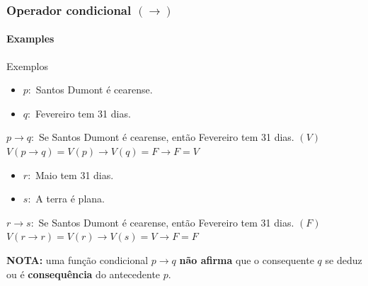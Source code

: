 \documentclass[10pt, headsepline, captions=tableabove, xcolor=table]{beamer}
\begin{document}
\begin{frame}[t]
    \frametitle{Operador condicional $(\rightarrow)$ }
    \framesubtitle{Examples}
    \small
    \begin{exampleblock}{Exemplos}
        \begin{itemize}
            \item[] $p:$ Santos Dumont é cearense.
            \item[] $q:$ Fevereiro tem 31 dias.
        \end{itemize}
        $p \rightarrow q:$ Se Santos Dumont é cearense, então Fevereiro tem 31 dias. $(V)$ \\[2pt]
        $V(p \rightarrow q) = V(p) \rightarrow V(q) = F \rightarrow F = V$
    \end{exampleblock}
    \vspace{-2mm}
    \begin{exampleblock}{}
        \begin{itemize}
            \item[] $r:$ Maio tem 31 dias.
            \item[] $s:$ A terra é plana. 
        \end{itemize}
        $r \rightarrow s:$ Se Santos Dumont é cearense, então Fevereiro tem 31 dias. $(F)$ \\[2pt]
        $V(r \rightarrow r) = V(r) \rightarrow V(s) = V \rightarrow F = F$
    \end{exampleblock}
    \vspace{-2mm}
    \begin{alertblock}{}
        \textbf{NOTA:} uma função condicional $p \rightarrow q$ \textbf{não afirma} que o consequente $q$ se deduz ou é \textbf{consequência} do antecedente $p$.
    \end{alertblock}
\end{frame}
%
\end{document}
